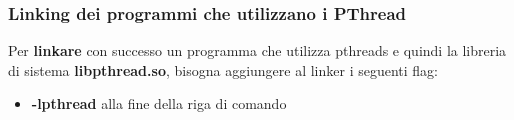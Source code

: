 \documentclass{article}
\begin{document}

    \subsubsection{Linking dei programmi che utilizzano i PThread}
    Per \textbf{linkare} con successo un programma che utilizza pthreads e quindi
    la libreria di sistema \textbf{libpthread.so}, bisogna aggiungere al linker i
    seguenti flag:
    \begin{itemize}
        \item \textbf{-lpthread} alla fine della riga di comando 
    \end{itemize}

\end{document}
